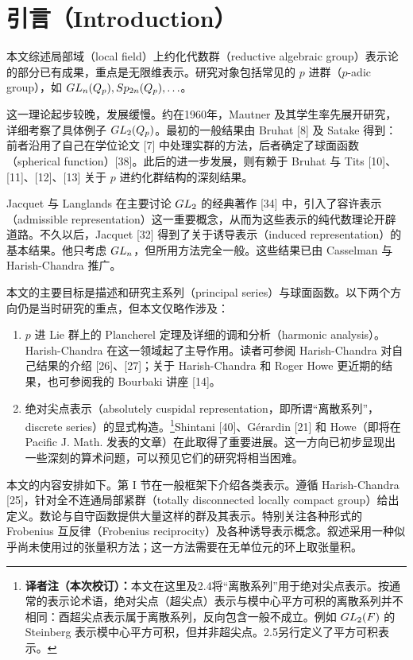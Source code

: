 \section*{引言（Introduction）}
本文综述局部域（local field）上约化代数群（reductive algebraic group）表示论的部分已有成果，重点是无限维表示。研究对象包括常见的 $p$ 进群（$p$-adic group），如 $GL_n(Q_p),Sp_{2n}(Q_p),\ldots$。

这一理论起步较晚，发展缓慢。约在1960年，Mautner 及其学生率先展开研究，详细考察了具体例子 $GL_2(Q_p)$。最初的一般结果由 Bruhat [8] 及 Satake 得到：前者沿用了自己在学位论文 [7] 中处理实群的方法，后者确定了球面函数（spherical function）[38]。此后的进一步发展，则有赖于 Bruhat 与 Tits [10]、[11]、[12]、[13] 关于 $p$ 进约化群结构的深刻结果。

Jacquet 与 Langlands 在主要讨论 $GL_2$ 的经典著作 [34] 中，引入了容许表示（admissible representation）这一重要概念，从而为这些表示的纯代数理论开辟道路。不久以后，Jacquet [32] 得到了关于诱导表示（induced representation）的基本结果。他只考虑 $GL_n$，但所用方法完全一般。这些结果已由 Casselman 与 Harish-Chandra 推广。

本文的主要目标是描述和研究主系列（principal series）与球面函数。以下两个方向仍是当时研究的重点，但本文仅略作涉及：
\begin{enumerate}
\item[(a)] $p$ 进 Lie 群上的 Plancherel 定理及详细的调和分析（harmonic analysis）。Harish-Chandra 在这一领域起了主导作用。读者可参阅 Harish-Chandra 对自己结果的介绍 [26]、[27]；关于 Harish-Chandra 和 Roger Howe 更近期的结果，也可参阅我的 Bourbaki 讲座 [14]。
\item[(b)] 绝对尖点表示（absolutely cuspidal representation，即所谓“离散系列”，discrete series）的显式构造。\footnote{\textbf{译者注（本次校订）：}本文在这里及2.4将“离散系列”用于绝对尖点表示。按通常的表示论术语，绝对尖点（超尖点）表示与模中心平方可积的离散系列并不相同：酉超尖点表示属于离散系列，反向包含一般不成立。例如 $GL_2(F)$ 的 Steinberg 表示模中心平方可积，但并非超尖点。2.5另行定义了平方可积表示。}Shintani [40]、Gérardin [21] 和 Howe（即将在 Pacific J. Math. 发表的文章）在此取得了重要进展。这一方向已初步显现出一些深刻的算术问题，可以预见它们的研究将相当困难。
\end{enumerate}
本文的内容安排如下。第 I 节在一般框架下介绍各类表示。遵循 Harish-Chandra [25]，针对全不连通局部紧群（totally disconnected locally compact group）给出定义。数论与自守函数提供大量这样的群及其表示。特别关注各种形式的 Frobenius 互反律（Frobenius reciprocity）及各种诱导表示概念。叙述采用一种似乎尚未使用过的张量积方法；这一方法需要在无单位元的环上取张量积。

